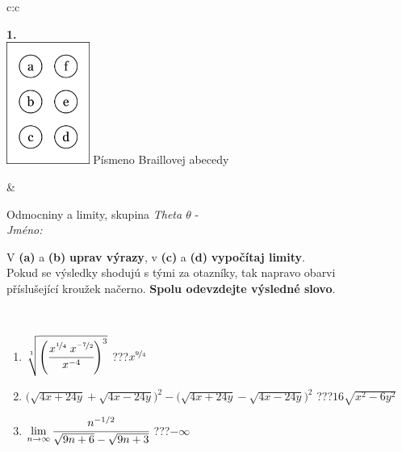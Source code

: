 \documentclass[10pt]{report}
\begin{document}
\begin{tabular}{c:c}
\begin{minipage}[c][104.5mm][t]{0.5\linewidth}
\begin{center}
\begin{minipage}{0.20\linewidth}
\begin{center}
{\Huge\bfseries 1.} \\[2mm]
\includegraphics[height=40mm]{../images/braille.png}
{\small Písmeno Braillovej abecedy}
\end{center}
\end{minipage}
\end{center}
\end{minipage}
&
\begin{minipage}[c][104.5mm][t]{0.5\linewidth}
\begin{center}
\vspace{7mm}
{\huge Odmocniny a limity, skupina \textit{Theta $\theta$} -}\\[5mm]
\textit{Jméno:}\phantom{xxxxxxxxxxxxxxxxxxxxxxxxxxxxxxxxxxxxxxxxxxxxxxxxxxxxxxxxxxxxxxxxx}\\[5mm]
\begin{minipage}{0.95\linewidth}
\begin{center}
V \textbf{(a)} a \textbf{(b)} \textbf{uprav výrazy}, v \textbf{(c)} a \textbf{(d)} \textbf{vypočítaj limity}.\\Pokud se výsledky shodujú s tými za otazníky, tak napravo obarvi\\příslušející kroužek načerno. \textbf{Spolu odevzdejte výsledné slovo}.
\end{center}
\end{minipage}
\\[1mm]
\begin{minipage}{0.79\linewidth}
\begin{center}
\begin{varwidth}{\linewidth}
\begin{enumerate}
\small
\item $\sqrt[1]{\left(\cfrac{x^{\nicefrac{1}{4}}\;x^{\nicefrac{-7}{2}}}{x^{-4}}\right)^{3}}$\quad \dotfill\; ???\;\dotfill \quad $x^{\nicefrac{9}{4}}$
\item {\footnotesize{\scriptsize$\big(\sqrt{4x+24y}+\sqrt{4x-24y}\big)^2-\big(\sqrt{4x+24y}-\sqrt{4x-24y}\big)^2$}\quad \dotfill\; ???\;\dotfill \quad $16\sqrt{x^2-6y^2}$}
\item $\lim\limits_{n\to\infty}\cfrac{n^{-1/2}}{\sqrt{9n+6}-\sqrt{9n+3}}$\quad \dotfill\; ???\;\dotfill \quad $-\infty$

\end{enumerate}
\end{varwidth}
\end{center}
\end{minipage}
\end{center}
\end{minipage}
\end{tabular}
\end{document}
